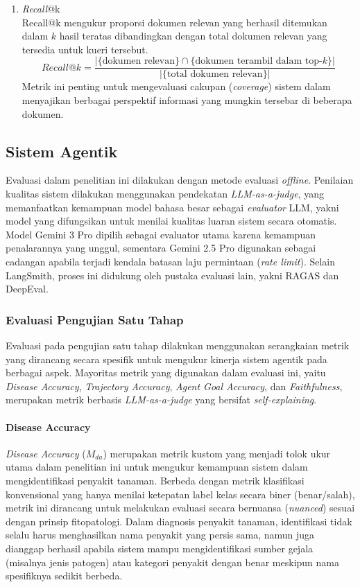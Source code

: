 \begin{enumerate}[noitemsep]
    \item \textit{Recall}@k \\
    Recall@k mengukur proporsi dokumen relevan yang berhasil ditemukan dalam $k$ hasil teratas dibandingkan dengan total dokumen relevan yang tersedia untuk kueri tersebut.
    \begin{equation}
        Recall@k = \frac{|\{ \text{dokumen relevan} \} \cap \{ \text{dokumen terambil dalam top-}k \}|}{|\{ \text{total dokumen relevan} \}|}
        \label{eq:recall_at_k}
    \end{equation}
    Metrik ini penting untuk mengevaluasi cakupan (\textit{coverage}) sistem dalam menyajikan berbagai perspektif informasi yang mungkin tersebar di beberapa dokumen.
\end{enumerate}

\subsection{Sistem Agentik}
Evaluasi dalam penelitian ini dilakukan dengan metode evaluasi \textit{offline}. Penilaian kualitas sistem dilakukan menggunakan pendekatan \textit{LLM-as-a-judge}, yang memanfaatkan kemampuan model bahasa besar sebagai \textit{evaluator} LLM, yakni model yang difungsikan untuk menilai kualitas luaran sistem secara otomatis. Model Gemini 3 Pro dipilih sebagai evaluator utama karena kemampuan penalarannya yang unggul, sementara Gemini 2.5 Pro digunakan sebagai cadangan apabila terjadi kendala batasan laju permintaan (\textit{rate limit}). Selain LangSmith, proses ini didukung oleh pustaka evaluasi lain, yakni RAGAS dan DeepEval.

\subsubsection{Evaluasi Pengujian Satu Tahap}
Evaluasi pada pengujian satu tahap dilakukan menggunakan serangkaian metrik yang dirancang secara spesifik untuk mengukur kinerja sistem agentik pada berbagai aspek. Mayoritas metrik yang digunakan dalam evaluasi ini, yaitu \textit{Disease Accuracy}, \textit{Trajectory Accuracy}, \textit{Agent Goal Accuracy}, dan \textit{Faithfulness}, merupakan metrik berbasis \textit{LLM-as-a-judge} yang bersifat \textit{self-explaining}.

\paragraph{Disease Accuracy}
\textit{Disease Accuracy} ($M_{da}$) merupakan metrik kustom yang menjadi tolok ukur utama dalam penelitian ini untuk mengukur kemampuan sistem dalam mengidentifikasi penyakit tanaman. Berbeda dengan metrik klasifikasi konvensional yang hanya menilai ketepatan label kelas secara biner (benar/salah), metrik ini dirancang untuk melakukan evaluasi secara bernuansa (\textit{nuanced}) sesuai dengan prinsip fitopatologi. Dalam diagnosis penyakit tanaman, identifikasi tidak selalu harus menghasilkan nama penyakit yang persis sama, namun juga dianggap berhasil apabila sistem mampu mengidentifikasi sumber gejala (misalnya jenis patogen) atau kategori penyakit dengan benar meskipun nama spesifiknya sedikit berbeda.

